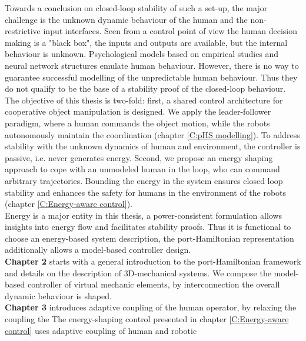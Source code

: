 \documentclass[a4paper,twoside, openright,12pt]{report}
\begin{document}
Towards a conclusion on closed-loop stability of such a set-up, the major challenge is the unknown dynamic behaviour of the human and the non-restrictive input interfaces. Seen from a control point of view the human decision making is a "black box", the inputs and outputs are available, but the internal behaviour is unknown. Psychological models based on empirical studies and neural network structures \cite{Peters_15} emulate human behaviour. However, there is no way to guarantee successful modelling of the unpredictable human behaviour. Thus they do not qualify to be the base of a stability proof of the closed-loop behaviour.\\
The objective of this thesis is two-fold: first, a shared control architecture for cooperative object manipulation is designed. We apply the leader-follower paradigm, where a human commands the object motion, while the robots autonomously maintain the coordination (chapter \ref{C:pHS modelling}). To address stability with the unknown dynamics of human and environment, the controller is passive, i.e. never generates energy. Second, we propose an energy shaping approach to cope with an unmodeled human in the loop, who can command arbitrary trajectories. Bounding the energy in the system ensures closed loop stability and enhances the safety for humans in the environment of the robots (chapter \ref{C:Energy-aware control}).\\
Energy is a major entity in this thesis, a power-consistent formulation allows insights into energy flow and facilitates stability proofs. Thus it is functional to choose an energy-based system description, the port-Hamiltonian representation additionally allows a model-based controller design.\\
\textbf{Chapter 2} starts with a general introduction to the port-Hamiltonian framework and details on the description of 3D-mechanical systems. We compose the model-based controller of virtual mechanic elements, by interconnection the overall dynamic behaviour is shaped.\\
\textbf{Chapter 3} introduces adaptive coupling of the human operator, by relaxing the coupling the 
The energy-shaping control presented in chapter \ref{C:Energy-aware control} uses adaptive coupling of human and robotic  
\end{document}
